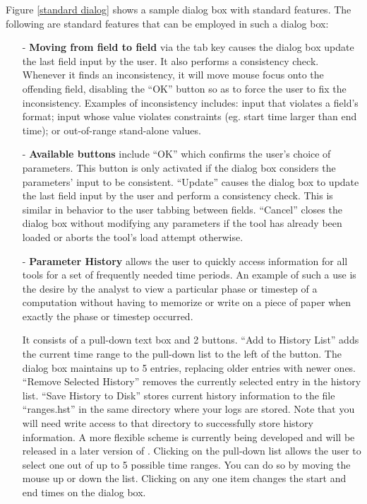 \documentclass[10pt]{report}
\begin{document}
Figure \ref{standard dialog} shows a sample dialog box with standard
features. The following are standard features that can be employed in
such a dialog box:

\begin{itemize}
\item[-] {\bf Moving from field to field} via the tab key causes the
dialog box update the last field input by the user. It also performs a
consistency check. Whenever it finds an inconsistency, it will move
mouse focus onto the offending field, disabling the ``OK'' button so
as to force the user to fix the inconsistency. Examples of
inconsistency includes: input that violates a field's format; input
whose value violates constraints (eg. start time larger than end
time); or out-of-range stand-alone values.
\item[-] {\bf Available buttons} include ``OK'' which confirms the
user's choice of parameters. This button is only activated if the
dialog box considers the parameters' input to be
consistent. ``Update'' causes the dialog box to update the last field
input by the user and perform a consistency check. This is similar in
behavior to the user tabbing between fields. ``Cancel'' closes the
dialog box without modifying any parameters if the tool has already
been loaded or aborts the tool's load attempt otherwise.
\item[-] {\bf Parameter History} allows the user to quickly access
information for all tools for a set of frequently needed time
periods. An example of such a use is the desire by the analyst to view
a particular phase or timestep of a computation without having to
memorize or write on a piece of paper when exactly the phase or
timestep occurred.

It consists of a pull-down text box and 2 buttons. ``Add to History
List'' adds the current time range to the pull-down list to the left
of the button. The dialog box maintains up to 5 entries, replacing
older entries with newer ones. ``Remove Selected History'' removes the
currently selected entry in the history list. ``Save History to Disk''
stores current history information to the file ``ranges.hst'' in the
same directory where your logs are stored. Note that you will need
write access to that directory to successfully store history
information. A more flexible scheme is currently being developed and
will be released in a later version of \projections{}. Clicking on the
pull-down list allows the user to select one out of up to 5 possible
time ranges. You can do so by moving the mouse up or down the
list. Clicking on any one item changes the start and end times on the
dialog box.
\end{itemize}
\end{document}
